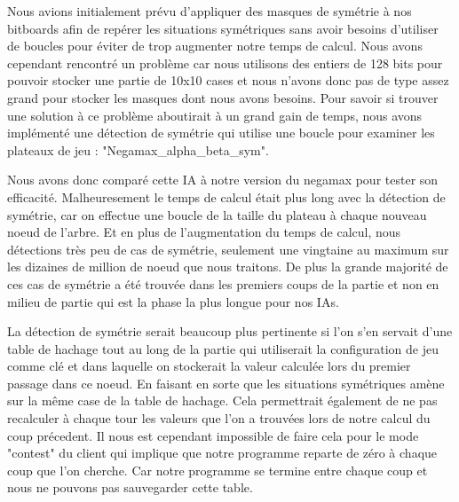 \documentclass[12pt]{article}
\begin{document}
Nous avions initialement prévu d'appliquer des masques de symétrie \cite{symmetry} à nos bitboards afin de repérer les situations symétriques sans avoir besoins d'utiliser de boucles pour éviter de trop augmenter notre temps de calcul.
Nous avons cependant rencontré un problème car nous utilisons des entiers de 128 bits pour pouvoir stocker une partie de 10x10 cases et nous n'avons donc pas de type assez grand pour stocker les masques dont nous avons besoins. Pour savoir si trouver une solution à ce problème aboutirait à un grand gain de temps, nous avons implémenté une détection de symétrie qui utilise une boucle pour examiner les plateaux de jeu : "Negamax\_alpha\_beta\_sym".

Nous avons donc comparé cette IA à notre version du negamax pour tester son efficacité. Malheuresement le temps de calcul était plus long avec la détection de symétrie, car on effectue une boucle de la taille du plateau à chaque nouveau noeud de l'arbre. Et en plus de l'augmentation du temps de calcul, nous détections très peu de cas de symétrie, seulement une vingtaine au maximum sur les dizaines de million de noeud que nous traitons. De plus la grande majorité de ces cas de symétrie a été trouvée dans les premiers coups de la partie et non en milieu de partie qui est la phase la plus longue pour nos IAs.

La détection de symétrie serait beaucoup plus pertinente si l'on s'en servait d'une table de hachage tout au long de la partie qui utiliserait la configuration de jeu comme clé et dans laquelle on stockerait la valeur calculée lors du premier passage dans ce noeud. En faisant en sorte que les situations symétriques amène sur la même case de la table de hachage. Cela permettrait également de ne pas recalculer à chaque tour les valeurs que l'on a trouvées lors de notre calcul du coup précedent. Il nous est cependant impossible de faire cela pour le mode "contest" du client qui implique que notre programme reparte de zéro à chaque coup que l'on cherche. Car notre programme se termine entre chaque coup et nous ne pouvons pas sauvegarder cette table.

\medbreak
\end{document}
